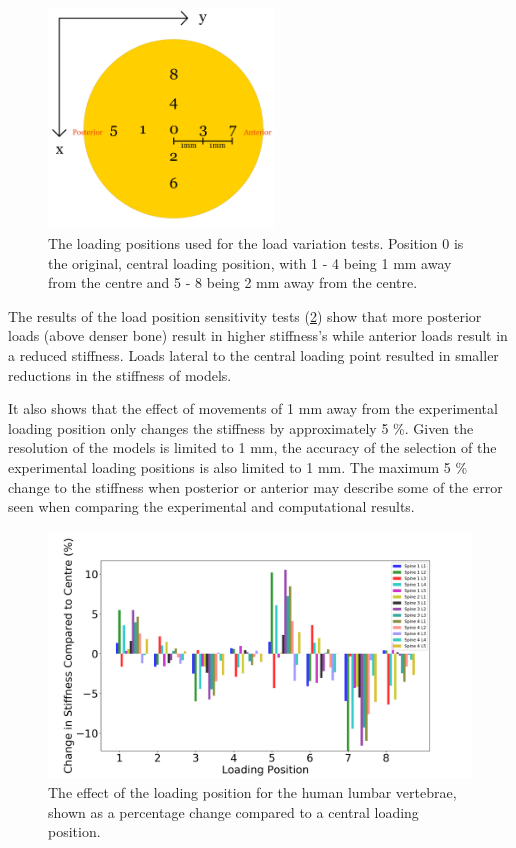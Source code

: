 \begin{figure}[ht!]
\centering
\includegraphics[width=6cm]{Chapters/Chapter_HT_images/Loading_positions.png}
\caption{The loading positions used for the load variation tests. Position 0 is the original, central loading position, with 1 - 4 being 1 mm away from the centre and 5 - 8 being 2 mm away from the centre.}
\label{fig:loading_pos}
\end{figure}


The results of the load position sensitivity tests (\cref{fig:hum_load}) show that more posterior loads (above denser bone) result in higher stiffness's while anterior loads result in a reduced stiffness. Loads lateral to the central loading point resulted in smaller reductions in the stiffness of models.

It also shows that the effect of movements of 1 mm away from the experimental loading position only changes the stiffness by approximately 5 \%.
Given the resolution of the models is limited to 1 mm, the accuracy of the selection of the experimental loading positions is also limited to 1 mm.
The maximum 5 \% change to the stiffness when posterior or anterior may describe some of the error seen when comparing the experimental and computational results.

\begin{figure}[ht!]
\centering
\includegraphics[width=\textwidth]{Chapters/Chapter_HT_images/human_fossil_loading.png}
\caption{The effect of the loading position for the human lumbar vertebrae, shown as a percentage change compared to a central loading position.}
\label{fig:hum_load}
\end{figure}



